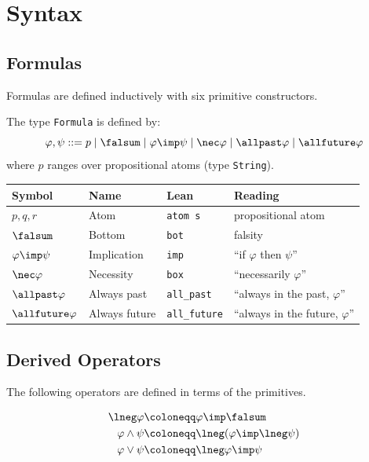 \documentclass[../BimodalReference.tex]{subfiles}
\begin{document}
\section{Syntax}

\subsection{Formulas}

Formulas are defined inductively with six primitive constructors.

\begin{definition}[Formula]
The type \texttt{Formula} is defined by:
\[
  \varphi, \psi ::= p \mid \falsum \mid \varphi \imp \psi \mid \nec\varphi \mid \allpast\varphi \mid \allfuture\varphi
\]
where $p$ ranges over propositional atoms (type \texttt{String}).
\end{definition}

\begin{center}
\begin{tabular}{@{}lllp{4.5cm}@{}}
\toprule
Symbol & Name & Lean & Reading \\
\midrule
$p, q, r$ & Atom & \texttt{atom s} & propositional atom \\
$\falsum$ & Bottom & \texttt{bot} & falsity \\
$\varphi \imp \psi$ & Implication & \texttt{imp} & ``if $\varphi$ then $\psi$'' \\
$\nec\varphi$ & Necessity & \texttt{box} & ``necessarily $\varphi$'' \\
$\allpast\varphi$ & Always past & \texttt{all\_past} & ``always in the past, $\varphi$'' \\
$\allfuture\varphi$ & Always future & \texttt{all\_future} & ``always in the future, $\varphi$'' \\
\bottomrule
\end{tabular}
\end{center}

\subsection{Derived Operators}

The following operators are defined in terms of the primitives.

\begin{definition}[Propositional]
\begin{align*}
  \lneg\varphi &\coloneqq \varphi \imp \falsum \\
  \varphi \land \psi &\coloneqq \lneg(\varphi \imp \lneg\psi) \\
  \varphi \lor \psi &\coloneqq \lneg\varphi \imp \psi
\end{align*}
\end{definition}
\end{document}
